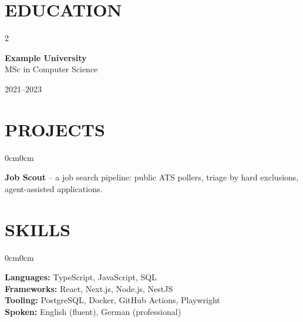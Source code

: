\documentclass[10pt, a4paper]{article}
\newenvironment{onecolentry}{
    \begin{adjustwidth}{0cm}{0cm}
}{
    \end{adjustwidth}
}
\newenvironment{twocolentry}[1]{%
  \def\secondColumn{#1}%
  \par
  \setcolumnwidth{\fill,4.5cm}%
  \begin{paracol}{2}%
    \raggedright
}{%
    \switchcolumn
    \raggedleft\strut\secondColumn\par
  \end{paracol}\par\nopagebreak
}
\begin{document}
\section{EDUCATION}

\begin{twocolentry}{2021--2023}
\textbf{Example University}\\
MSc in Computer Science
\end{twocolentry}

\section{PROJECTS}

\begin{onecolentry}
\textbf{Job Scout} -- a job search pipeline: public ATS pollers, triage by hard exclusions, agent-assisted applications.
\end{onecolentry}

\section{SKILLS}

\begin{onecolentry}
\textbf{Languages:} TypeScript, JavaScript, SQL \\
\textbf{Frameworks:} React, Next.js, Node.js, NestJS \\
\textbf{Tooling:} PostgreSQL, Docker, GitHub Actions, Playwright \\
\textbf{Spoken:} English (fluent), German (professional)
\end{onecolentry}
\end{document}
